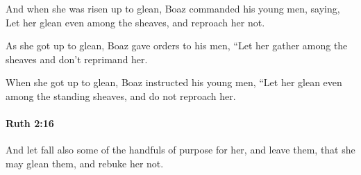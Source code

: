 			\begin{versebox}
					\item[BHS] 
					\item[LXX] 
					\item[ASV] And when she was risen up to glean, Boaz commanded his young men, saying, Let her glean even among the sheaves, and reproach her not.
					\item[NIV] As she got up to glean, Boaz gave orders to his men, “Let her gather among the sheaves and don’t reprimand her.
					\item[NRSV] When she got up to glean, Boaz instructed his young men, “Let her glean even among the standing sheaves, and do not reproach her.
			\end{versebox}

		\paragraph{Ruth 2:16} %
			\label{RUTH-2-16}

			And let fall also some of the handfuls of purpose for her, and leave them, that she may glean them, and rebuke her not.

